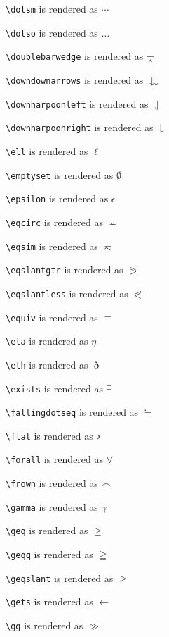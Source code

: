 \texttt{\textbackslash dotsm} is rendered as $\dotsm$

\texttt{\textbackslash dotso} is rendered as $\dotso$

\texttt{\textbackslash doublebarwedge} is rendered as $\doublebarwedge$

\texttt{\textbackslash downdownarrows} is rendered as $\downdownarrows$

\texttt{\textbackslash downharpoonleft} is rendered as $\downharpoonleft$

\texttt{\textbackslash downharpoonright} is rendered as $\downharpoonright$

\texttt{\textbackslash ell} is rendered as $\ell$

\texttt{\textbackslash emptyset} is rendered as $\emptyset$

\texttt{\textbackslash epsilon} is rendered as $\epsilon$

\texttt{\textbackslash eqcirc} is rendered as $\eqcirc$

\texttt{\textbackslash eqsim} is rendered as $\eqsim$

\texttt{\textbackslash eqslantgtr} is rendered as $\eqslantgtr$

\texttt{\textbackslash eqslantless} is rendered as $\eqslantless$

\texttt{\textbackslash equiv} is rendered as $\equiv$

\texttt{\textbackslash eta} is rendered as $\eta$

\texttt{\textbackslash eth} is rendered as $\eth$

\texttt{\textbackslash exists} is rendered as $\exists$

\texttt{\textbackslash fallingdotseq} is rendered as $\fallingdotseq$

\texttt{\textbackslash flat} is rendered as $\flat$

\texttt{\textbackslash forall} is rendered as $\forall$

\texttt{\textbackslash frown} is rendered as $\frown$

\texttt{\textbackslash gamma} is rendered as $\gamma$

\texttt{\textbackslash geq} is rendered as $\geq$

\texttt{\textbackslash geqq} is rendered as $\geqq$

\texttt{\textbackslash geqslant} is rendered as $\geqslant$

\texttt{\textbackslash gets} is rendered as $\gets$

\texttt{\textbackslash gg} is rendered as $\gg$


